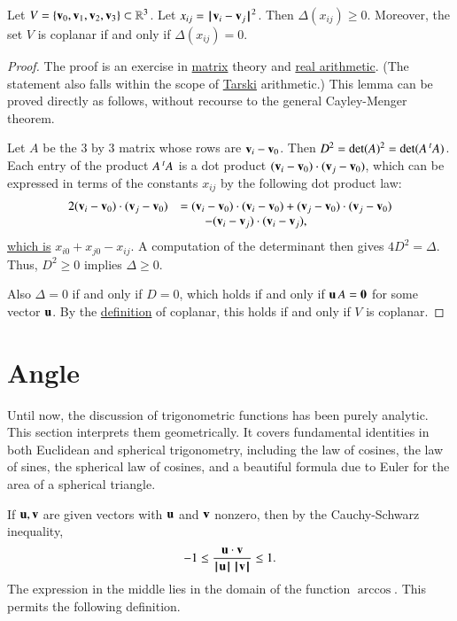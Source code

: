\begin{lemma}  
Let $V=\{{\mathbf v}_0,{\mathbf v}_1,{\mathbf v}_2,{\mathbf v}_3\}\subset\mathbb{R}^3$.  
Let $x_{ij} = {\hskip0.1em|\hskip-0.15em|\hskip0.1em}{\mathbf v}_i - {\mathbf v}_j{\hskip0.1em|\hskip-0.15em|\hskip0.1em}^2$.
Then $\Delta(x_{ij})\ge 0$.  Moreover, the set $V$ is coplanar if and only if
$\Delta(x_{ij}) = 0$.
\end{lemma}

\begin{proof}  The proof is an exercise in \hyperref[back:matrix]{matrix} theory and \hyperref[back:analysis]{real arithmetic}.  (The statement also falls within the scope of \hyperref[back:tarski]{Tarski} arithmetic.)  This  lemma
can be proved directly as follows, without recourse to the general Cayley-Menger theorem.

Let $A$ be the $3$ by $3$ matrix whose rows are ${\mathbf v}_i - {\mathbf v}_0$.  
Then $D^2 = \det(A)^2 = \det(A \,\hbox{}^t A)$.  Each entry of the product
$A\,\hbox{}^tA$ is a dot product $({\mathbf v}_i-{\mathbf v}_0)\cdot ({\mathbf v}_j-{\mathbf v}_0)$, which can be
expressed in terms of the constants $x_{ij}$ by the following dot product law:
\begin{equation}\label{eqn:dot-law}
\begin{array}{lll}
2 ({\mathbf v}_i-{\mathbf v}_0)\cdot ({\mathbf v}_j-{\mathbf v}_0) &= ({\mathbf v}_i-{\mathbf v}_0)\cdot({\mathbf v}_i-{\mathbf v}_0) + ({\mathbf v}_j-{\mathbf v}_0)\cdot ({\mathbf v}_j-{\mathbf v}_0) \\
  &\qquad - ({\mathbf v}_i-{\mathbf v}_j)\cdot ({\mathbf v}_i-{\mathbf v}_j),
\end{array}
\end{equation}
\hyperref[def:norm]{which is} $x_{i0} + x_{j0} - x_{ij}$.
A computation of the determinant then gives $4D^2=\Delta$.
Thus, $D^2\ge0$ implies $\Delta\ge 0$.

Also $\Delta=0$ if and only if $D=0$, which holds if and only if ${\mathbf u}\, A = {\mathbf 0}$ for
some vector ${\mathbf u}$.  By the \hyperref[def:plane]{definition} of coplanar, this holds if and only if $V$ is coplanar.
\end{proof}


\section{Angle}\label{sec:angle}

Until now, the discussion of trigonometric functions has been purely analytic.  This section
interprets them geometrically.
It covers fundamental identities
in both Euclidean and spherical trigonometry, including the law
of cosines, the law of sines, the spherical law of cosines, 
and a beautiful formula due to Euler for
the area of a spherical triangle.

If ${\mathbf u},{\mathbf v}$ are given vectors with ${\mathbf u}$ and ${\mathbf v}$ nonzero, then by the
Cauchy-Schwarz inequality,
    $$-1 \le \frac{{\mathbf u}\cdot {\mathbf v}}{{{\hskip0.1em|\hskip-0.15em|\hskip0.1em}{\mathbf u}{\hskip0.1em|\hskip-0.15em|\hskip0.1em}}\,{{\hskip0.1em|\hskip-0.15em|\hskip0.1em}{\mathbf v}{\hskip0.1em|\hskip-0.15em|\hskip0.1em}}} \le 1.$$
The expression in the middle lies in the domain of the function $\arccos$. This permits the following definition.
%
%
%

